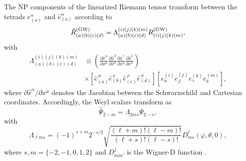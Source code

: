 \documentclass[reprint,amsmath,amssymb,aps,prd]{revtex4-2}
\begin{document}
The NP components of the linearized Riemann tensor transform between the tetrads $e^{\alpha}_{(a)}$ and $\hat{e}^{\alpha}_{(a)}$ according to
\begin{equation}
\hat{R}^{\rm(GW)}_{(a)(b)(c)(d)}=\Lambda^{(i)(j)(k)(m)}_{(a)(b)(c)(d)}R^{\rm(GW)}_{(i)(j)(k)(m)},
\end{equation}
with
\begin{equation}
\begin{aligned}
\Lambda^{(i)(j)(k)(m)}_{(a)(b)(c)(d)}&\equiv\left(\frac{\partial \hat{x}^{\alpha}}{\partial x^{\mu}}
\frac{\partial \hat{x}^{\beta}}{\partial x^{\nu}}
\frac{\partial \hat{x}^{\gamma}}{\partial x^{\rho}}
\frac{\partial \hat{x}^{\delta}}{\partial x^{\sigma}}\right)\\
&\times\left[\hat{e}^{\,\mu}_{(a)}\hat{e}^{\,\nu}_{(b)}\hat{e}^{\,\rho}_{(c)}\hat{e}^{\,\sigma}_{(d)}\right]
\left[e^{(i)}_{\alpha}e^{(j)}_{\beta}e^{(k)}_{\gamma}e^{(m)}_{\delta}\right],
\end{aligned}
\end{equation}
where $\partial \hat{x}^{\alpha}/\partial x^{\mu}$ denotes the Jacobian between the Schwarzschild and Cartesian coordinates. Accordingly, the Weyl scalars transform as
\begin{equation}
\label{eq_4:Weyl_transformation}
\hat{\Psi}_{2-m}=\Lambda_{2ms}\Psi_{2-s},
\end{equation}
with
\begin{equation}
\Lambda_{\ell ms}=(-1)^{s+m}2^{-s/2}\sqrt{\frac{(\ell+m)! (\ell-m)!}{(\ell+s)!(\ell-s)!}}D^{\ell}_{ms}(\varphi,\theta,0),
\end{equation}
where $s,m=\{-2,-1,0,1,2\}$ and $D^{j}_{mm'}$ is the Wigner-D function \cite{NIST:DLMF}.
\end{document}
